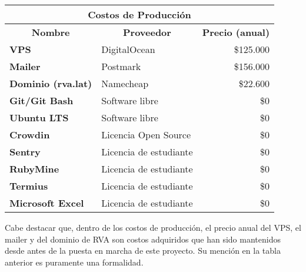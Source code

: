 \begin{center}
	\begin{tabular}{ | l | p{5cm} | p{5cm}|}
		\hline
		\multicolumn{3}{|c|}{\textbf{Costos de Producción}} \\
		\hline
		\multicolumn{1}{|c|}{\textbf{Nombre}} & \multicolumn{1}{|c|}{\textbf{Proveedor}} & \multicolumn{1}{|c|}{\textbf{Precio (anual)}} \\
		\hline
		{\textbf{VPS}} & DigitalOcean & \multicolumn{1}{|r|}{\$125.000} \\ \hline
		
		{\textbf{Mailer}} & Postmark & \multicolumn{1}{|r|}{\$156.000} \\ \hline
		
		{\textbf{Dominio (rva.lat)}} & Namecheap & \multicolumn{1}{|r|}{\$22.600} \\ \hline
    
		{\textbf{Git/Git Bash}} & Software libre & \multicolumn{1}{|r|}{\$0} \\ \hline
		
		{\textbf{Ubuntu LTS}} & Software libre & \multicolumn{1}{|r|}{\$0} \\ \hline
    
    {\textbf{Crowdin}} & Licencia Open Source & \multicolumn{1}{|r|}{\$0} \\ \hline
    
    {\textbf{Sentry}} & Licencia de estudiante & \multicolumn{1}{|r|}{\$0} \\ \hline
		
		{\textbf{RubyMine}} & Licencia de estudiante & \multicolumn{1}{|r|}{\$0} \\ \hline
		
		{\textbf{Termius}} & Licencia de estudiante & \multicolumn{1}{|r|}{\$0} \\ \hline
		
		{\textbf{Microsoft Excel}} & Licencia de estudiante & \multicolumn{1}{|r|}{\$0} \\ \hline
	\end{tabular}

  \label{table:costs:production}
\end{center}

Cabe destacar que, dentro de los costos de producción, el precio anual del VPS, el mailer y del dominio de RVA son costos adquiridos que han sido mantenidos desde antes de la puesta en marcha de este proyecto. Su mención en la tabla anterior es puramente una formalidad.

